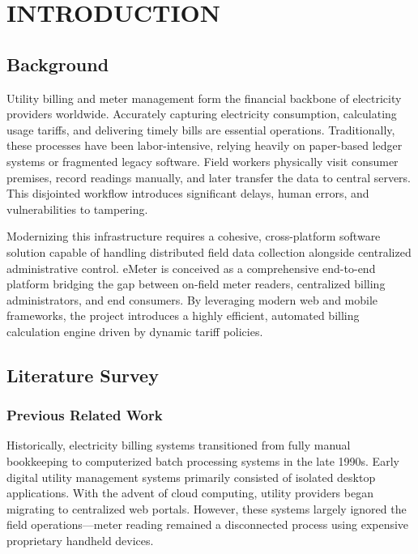 \documentclass[12pt, a4paper, onecolumn]{report}
\begin{document}
\clearpage
{}


\chapter{INTRODUCTION}

\section{Background}
Utility billing and meter management form the financial backbone of electricity providers worldwide. Accurately capturing electricity consumption, calculating usage tariffs, and delivering timely bills are essential operations. Traditionally, these processes have been labor-intensive, relying heavily on paper-based ledger systems or fragmented legacy software. Field workers physically visit consumer premises, record readings manually, and later transfer the data to central servers. This disjointed workflow introduces significant delays, human errors, and vulnerabilities to tampering.

Modernizing this infrastructure requires a cohesive, cross-platform software solution capable of handling distributed field data collection alongside centralized administrative control. eMeter is conceived as a comprehensive end-to-end platform bridging the gap between on-field meter readers, centralized billing administrators, and end consumers. By leveraging modern web and mobile frameworks, the project introduces a highly efficient, automated billing calculation engine driven by dynamic tariff policies.

\section{Literature Survey}
\subsection{Previous Related Work}
Historically, electricity billing systems transitioned from fully manual bookkeeping to computerized batch processing systems in the late 1990s. Early digital utility management systems primarily consisted of isolated desktop applications. With the advent of cloud computing, utility providers began migrating to centralized web portals. However, these systems largely ignored the field operations---meter reading remained a disconnected process using expensive proprietary handheld devices.
\end{document}
